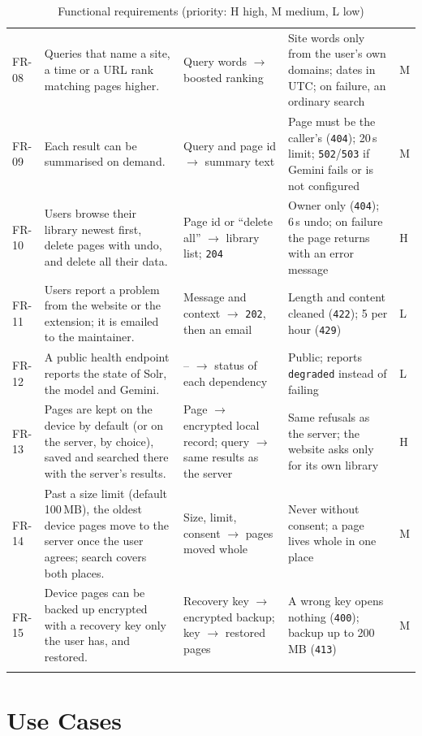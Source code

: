 {\begin{longtable}{>{\ttfamily}p{} >{\raggedright\arraybackslash}p{} >{\raggedright\arraybackslash}p{} >{\raggedright\arraybackslash}p{} p{}}
FR-08 & Queries that name a site, a time or a URL rank matching pages higher. & Query words $\rightarrow$ boosted ranking & Site words only from the user's own domains; dates in UTC; on failure, an ordinary search & M \\
FR-09 & Each result can be summarised on demand. & Query and page id $\rightarrow$ summary text & Page must be the caller's (\texttt{404}); 20\,s limit; \texttt{502}/\texttt{503} if Gemini fails or is not configured & M \\
FR-10 & Users browse their library newest first, delete pages with undo, and delete all their data. & Page id or ``delete all'' $\rightarrow$ library list; \texttt{204} & Owner only (\texttt{404}); 6\,s undo; on failure the page returns with an error message & H \\
FR-11 & Users report a problem from the website or the extension; it is emailed to the maintainer. & Message and context $\rightarrow$ \texttt{202}, then an email & Length and content cleaned (\texttt{422}); 5 per hour (\texttt{429}) & L \\
FR-12 & A public health endpoint reports the state of Solr, the model and Gemini. & -- $\rightarrow$ status of each dependency & Public; reports \texttt{degraded} instead of failing & L \\
FR-13 & Pages are kept on the device by default (or on the server, by choice), saved and searched there with the server's results. & Page $\rightarrow$ encrypted local record; query $\rightarrow$ same results as the server & Same refusals as the server; the website asks only for its own library & H \\
FR-14 & Past a size limit (default 100\,MB), the oldest device pages move to the server once the user agrees; search covers both places. & Size, limit, consent $\rightarrow$ pages moved whole & Never without consent; a page lives whole in one place & M \\
FR-15 & Device pages can be backed up encrypted with a recovery key only the user has, and restored. & Recovery key $\rightarrow$ encrypted backup; key $\rightarrow$ restored pages & A wrong key opens nothing (\texttt{400}); backup up to 200\,MB (\texttt{413}) & M \\
\bottomrule
\caption{Functional requirements (priority: H high, M medium, L low)}
\label{tab:fr}
\end{longtable}
}

\section{Use Cases}

